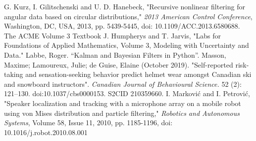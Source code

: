 \documentclass[11pt]{amsart}
\begin{document}
\FloatBarrier %
\newpage


\begin{thebibliography}{99}
 G. Kurz, I. Gilitschenski and U. D. Hanebeck, "Recursive nonlinear filtering for angular data based on circular distributions," \textit{2013 American Control Conference}, Washington, DC, USA, 2013, pp. 5439-5445, doi: 10.1109/ACC.2013.6580688.
 The ACME Volume 3 Textbook
 J. Humpherys and T. Jarvis, "Labs for Foundations of Applied Mathematics, Volume 3, Modeling with Uncertainty and Data."
 Labbe, Roger. “Kalman and Bayesian Filters in Python”.
 Masson, Maxime; Lamoureux, Julie; de Guise, Elaine (October 2019). "Self-reported risk-taking and sensation-seeking behavior predict helmet wear amongst Canadian ski and snowboard instructors". \textit{Canadian Journal of Behavioural Science.} 52 (2): 121–130. doi:10.1037/cbs0000153. S2CID 210359660.
 I. Marković and I. Petrović, "Speaker localization and tracking with a microphone array on a mobile robot using von Mises distribution and particle filtering," \textit{Robotics and Autonomous Systems}, Volume 58, Issue 11, 2010, pp. 1185-1196, doi: 10.1016/j.robot.2010.08.001
\end{thebibliography}
\end{document}
